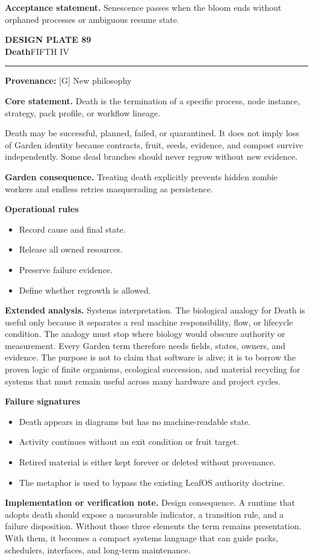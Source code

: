 \documentclass[10pt,letterpaper,oneside]{article}
\newcommand{\prov}[1]{\textcolor{gardenBlue}{\sffamily\footnotesize\textbf{Provenance:} #1}}
\newcommand{\platetitle}[3]{%
  \begin{minipage}[t][0.54in][t]{\textwidth}
  {\sffamily\bfseries\color{gardenDeep}\fontsize{9}{10}\selectfont DESIGN PLATE #1}\\[-1pt]
  {\sffamily\bfseries\color{gardenInk}\fontsize{16.5}{18}\selectfont #2}\hfill{\sffamily\color{gardenGreen}\large #3}
  \end{minipage}\vspace{-2pt}\hrule\vspace{5pt}}
\begin{document}
\begin{acceptbox}
\textbf{Acceptance statement.} Senescence passes when the bloom ends without orphaned processes or ambiguous resume state.
\end{acceptbox}
\newpage
\platetitle{89}{Death}{FIFTH IV}
\prov{[G] New philosophy}
\fontsize{8.85}{10.45}\selectfont
\begin{corebox}
\textbf{Core statement.} Death is the termination of a specific process, node instance, strategy, pack profile, or workflow lineage.
\end{corebox}
Death may be successful, planned, failed, or quarantined. It does not imply loss of Garden identity because contracts, fruit, seeds, evidence, and compost survive independently. Some dead branches should never regrow without new evidence.

\textbf{Garden consequence.} Treating death explicitly prevents hidden zombie workers and endless retries masquerading as persistence.

\textbf{Operational rules}
\begin{itemize}
\item Record cause and final state.
\item Release all owned resources.
\item Preserve failure evidence.
\item Define whether regrowth is allowed.
\end{itemize}
\textbf{Extended analysis.} Systems interpretation. The biological analogy for Death is useful only because it separates a real machine responsibility, flow, or lifecycle condition. The analogy must stop where biology would obscure authority or measurement. Every Garden term therefore needs fields, states, owners, and evidence. The purpose is not to claim that software is alive; it is to borrow the proven logic of finite organisms, ecological succession, and material recycling for systems that must remain useful across many hardware and project cycles.

\textbf{Failure signatures}
\begin{itemize}
\item Death appears in diagrams but has no machine-readable state.
\item Activity continues without an exit condition or fruit target.
\item Retired material is either kept forever or deleted without provenance.
\item The metaphor is used to bypass the existing LeafOS authority doctrine.
\end{itemize}
\textbf{Implementation or verification note.} Design consequence. A runtime that adopts death should expose a measurable indicator, a transition rule, and a failure disposition. Without those three elements the term remains presentation. With them, it becomes a compact systems language that can guide packs, schedulers, interfaces, and long-term maintenance.
\end{document}
